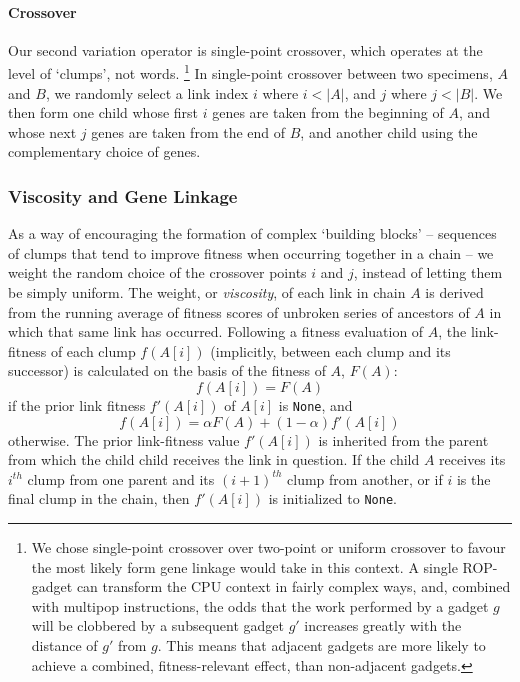 \paragraph{Crossover}
Our second variation operator is single-point crossover, which
operates at the level of `clumps', not words.%
\footnote{We chose
single-point crossover over two-point or uniform crossover
to favour the most likely form gene linkage would take in this
context. A single ROP-gadget can transform the CPU context in
fairly complex ways, and, combined with multipop instructions,
the odds that the work performed by a gadget $g$ will be
clobbered by a subsequent gadget $g'$ increases greatly with the
distance of $g'$ from $g$. This means that adjacent gadgets are
more likely to achieve a combined, fitness-relevant effect, than
non-adjacent gadgets.}
In single-point crossover between two specimens, $A$ and $B$, we
randomly select a link index $i$ where $i < |A|$, and $j$ where $j
< |B|$. We then form one child whose first $i$ genes are taken
from the beginning of $A$, and whose next $j$ genes are taken
from the end of $B$, and another child using the complementary
choice of genes. 

\subsubsection{Viscosity and Gene Linkage}

As a way of encouraging the formation of complex `building
blocks' -- sequences of clumps that tend to improve fitness when
occurring together in a chain -- we weight the random choice of
the crossover points $i$ and $j$, instead of letting them be
simply uniform. The weight, or \emph{viscosity}, of each
link in chain $A$ is derived from the running average of fitness
scores of unbroken series of ancestors of $A$ in which that same link
has occurred. Following a fitness evaluation of $A$, the
link-fitness of each clump $f(A[i])$ (implicitly, between each
clump and its successor) is calculated on the basis of the
fitness of $A$, $F(A)$: 
  $$ f(A[i]) = F(A)$$
if the prior link fitness $f'(A[i])$ of $A[i]$ is \texttt{None},
and 
  $$ f(A[i]) = \alpha F(A) + (1-\alpha) f'(A[i]) $$
otherwise. The prior link-fitness value $f'(A[i])$ is inherited
from the parent from which the child child receives the link in
question. If the child $A$ receives its $i^{th}$ clump from one
parent and its $(i+1)^{th}$ clump from another, or if $i$ is the
final clump in the chain, then $f'(A[i])$ is initialized to
\texttt{None}.

